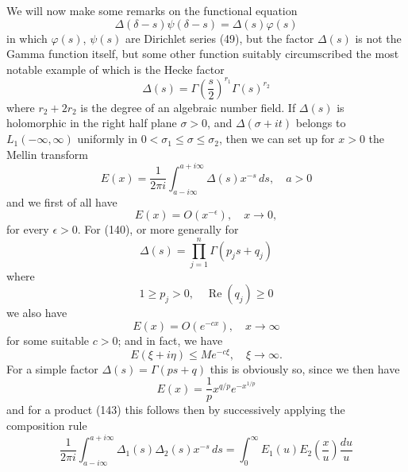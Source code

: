 \documentclass[12pt]{article}
\begin{document}
We will now make some remarks on the functional equation
\begin{equation}
\Delta(\delta - s)\psi(\delta - s) = \Delta(s)\varphi(s)
\tag{139}
\end{equation}
in which \(\varphi(s)\), \(\psi(s)\) are Dirichlet series (49), but the factor \(\Delta(s)\) is not the Gamma function itself, but some other function suitably circumscribed the most notable example of which is the Hecke factor
\begin{equation}
\Delta(s) = \Gamma\left(\frac{s}{2}\right)^{r_1} \Gamma(s)^{r_2}
\tag{140}
\end{equation}
where \(r_2 + 2r_2\) is the degree of an algebraic number field. If \(\Delta(s)\) is holomorphic in the right half plane \(\sigma > 0\), and \(\Delta(\sigma + it)\) belongs to \(L_1(-\infty, \infty)\) uniformly in \(0 < \sigma_1 \le \sigma \le \sigma_2\), then we can set up for \(x > 0\) the Mellin transform
\begin{equation}
E(x) = \frac{1}{2\pi i} \int_{a-i\infty}^{a+i\infty} \Delta(s)x^{-s} \, ds, \quad a > 0
\tag{141}
\end{equation}
and we first of all have
\begin{equation}
E(x) = O(x^{-\epsilon}), \quad x \to 0,
\tag{142}
\end{equation}
for every \(\epsilon > 0\). For (140), or more generally for
\begin{equation}
\Delta(s) = \prod_{j=1}^n \Gamma(p_j s + q_j)
\tag{143}
\end{equation}
where
\begin{equation}
1 \ge p_j > 0, \quad \operatorname{Re}(q_j) \ge 0
\tag{144}
\end{equation}
we also have
\begin{equation}
E(x) = O(e^{-cx}), \quad x \to \infty
\tag{145}
\end{equation}
for some suitable \(c > 0\); and in fact, we have
\begin{equation}
E(\xi + i\eta) \le Me^{-c\xi}, \quad \xi \to \infty.
\tag{146}
\end{equation}
For a simple factor \(\Delta(s) = \Gamma(ps + q)\) this is obviously so, since we then have
\begin{equation}
E(x) = \frac{1}{p} x^{q/p} e^{-x^{1/p}}
\tag{147}
\end{equation}
and for a product (143) this follows then by successively applying the composition rule
\begin{equation}
\frac{1}{2\pi i} \int_{a-i\infty}^{a+i\infty} \Delta_1(s)\Delta_2(s)x^{-s} \, ds = \int_0^{\infty} E_1(u) E_2 \left( \frac{x}{u} \right) \frac{du}{u}
\tag{148}
\end{equation}
\end{document}
